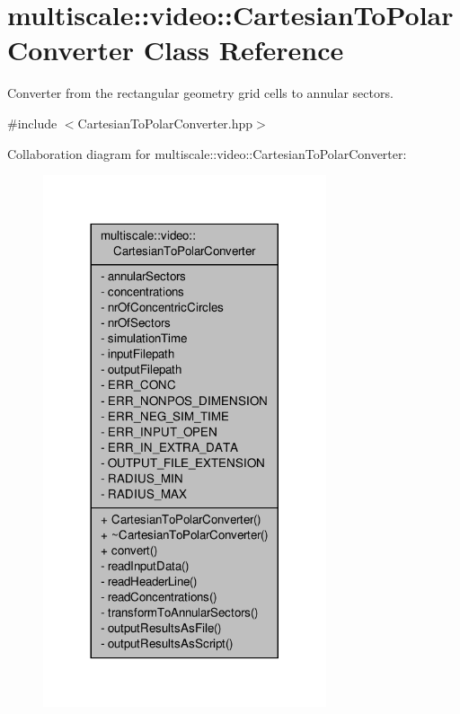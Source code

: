 \hypertarget{classmultiscale_1_1video_1_1CartesianToPolarConverter}{\section{multiscale\-:\-:video\-:\-:Cartesian\-To\-Polar\-Converter Class Reference}
\label{classmultiscale_1_1video_1_1CartesianToPolarConverter}
}


Converter from the rectangular geometry grid cells to annular sectors.  




{\ttfamily \#include $<$Cartesian\-To\-Polar\-Converter.\-hpp$>$}



Collaboration diagram for multiscale\-:\-:video\-:\-:Cartesian\-To\-Polar\-Converter\-:\nopagebreak
\begin{figure}[H]
\begin{center}
\leavevmode
\includegraphics[width=236pt]{classmultiscale_1_1video_1_1CartesianToPolarConverter__coll__graph}
\end{center}
\end{figure}
